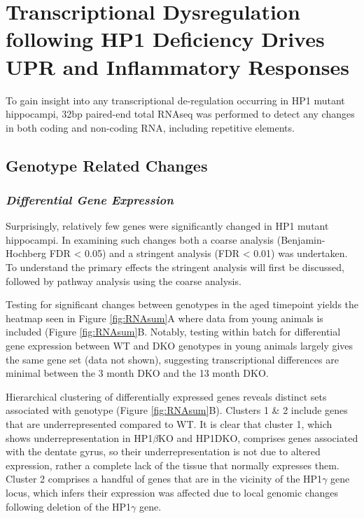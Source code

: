 \documentclass[onehalf,12pt]{beavtex}
\begin{document}
  \FloatBarrier
  \clearpage
  
  \section{Transcriptional Dysregulation following HP1 Deficiency Drives
  UPR and Inflammatory Responses}\label{RNAresults}
  
  To gain insight into any transcriptional de-regulation occurring in HP1
  mutant hippocampi, 32bp paired-end total RNAseq was performed to detect
  any changes in both coding and non-coding RNA, including repetitive
  elements.
  
  \subsection{Genotype Related Changes}\label{genotype-related-changes}
  
  \subsubsection*{\texorpdfstring{\emph{Differential Gene
  Expression}}{Differential Gene Expression}}\label{differential-gene-expression}
  
  Surprisingly, relatively few genes were significantly changed in HP1
  mutant hippocampi. In examining such changes both a coarse analysis
  (Benjamin-Hochberg FDR \textless{} 0.05) and a stringent analysis (FDR
  \textless{} 0.01) was undertaken. To understand the primary effects the
  stringent analysis will first be discussed, followed by pathway analysis
  using the coarse analysis.
  
  Testing for significant changes between genotypes in the aged timepoint
  yields the heatmap seen in Figure \ref{fig:RNAsum}A where data from
  young animals is included (Figure \ref{fig:RNAsum}B. Notably, testing
  within batch for differential gene expression between WT and DKO
  genotypes in young animals largely gives the same gene set (data not
  shown), suggesting transcriptional differences are minimal between the 3
  month DKO and the 13 month DKO.
  
  Hierarchical clustering of differentially expressed genes reveals
  distinct sets associated with genotype (Figure \ref{fig:RNAsum}B).
  Clusters 1 \& 2 include genes that are underrepresented compared to WT.
  It is clear that cluster 1, which shows underrepresentation in
  HP1\(\beta\)KO and HP1DKO, comprises genes associated with the dentate
  gyrus, so their underrepresentation is not due to altered expression,
  rather a complete lack of the tissue that normally expresses them.
  Cluster 2 comprises a handful of genes that are in the vicinity of the
  HP1\(\gamma\) gene locus, which infers their expression was affected due
  to local genomic changes following deletion of the HP1\(\gamma\) gene.
  
\end{document}
